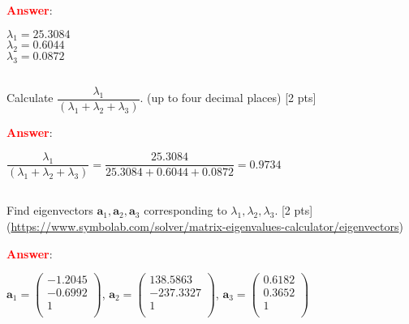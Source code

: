 \documentclass{homework}
\begin{document}
    \textbf{\textcolor{red}{Answer}}:
    
    $\lambda_1 = 25.3084$ \\
    $\lambda_2 = 0.6044$ \\
    $\lambda_3 = 0.0872$
    
    \subsection{}
    Calculate $\dfrac{\lambda_{1}}{(\lambda_{1} +\lambda_{2} + \lambda_{3})}$. (up to four decimal places) [2 pts]
    
    \textbf{\textcolor{red}{Answer}}:
    
    $\dfrac{\lambda_{1}}{(\lambda_{1} +\lambda_{2} + \lambda_{3})} = \dfrac{25.3084}{25.3084 + 0.6044 + 0.0872} = 0.9734$
    
    \subsection{}
    Find eigenvectors $\textbf{a}_{1}, \textbf{a}_{2}, \textbf{a}_{3}$ corresponding to $\lambda_{1}, \lambda_{2}, \lambda_{3}$. [2 pts] \\
    (\href{<https://www.symbolab.com/solver/matrix-eigenvalues-calculator/eigenvectors>}{https://www.symbolab.com/solver/matrix-eigenvalues-calculator/eigenvectors})    
    
    \textbf{\textcolor{red}{Answer}}: 
    
    $\textbf{a}_1 = \left(\begin{matrix}
    -1.2045 \\
    -0.6992 \\
    1 \\
    \end{matrix}\right)$, \quad 
    $\textbf{a}_2 = \left(\begin{matrix}
    138.5863 \\
    -237.3327 \\
    1 \\
    \end{matrix}\right)$, \quad
    $\textbf{a}_3 = \left(\begin{matrix}
    0.6182 \\
    0.3652 \\
    1 \\
    \end{matrix}\right)$
    
    \vspace{10mm}
     
\end{document}
